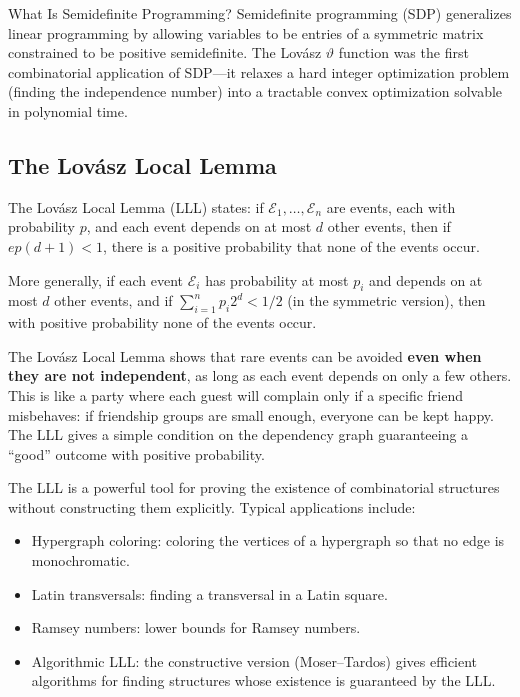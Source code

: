 \begin{knowledgebridge}{What Is Semidefinite Programming?}
Semidefinite programming (SDP) generalizes linear programming by allowing variables to be entries of a symmetric matrix constrained to be positive semidefinite. The Lov\'asz $\vartheta$ function was the first combinatorial application of SDP---it relaxes a hard integer optimization problem (finding the independence number) into a tractable convex optimization solvable in polynomial time.
\end{knowledgebridge}

\subsection{The Lov\'asz Local Lemma}

The Lov\'asz Local Lemma (LLL) states: if $\mathcal{E}_1, \ldots, \mathcal{E}_n$ are events, each with probability $p$, and each event depends on at most $d$ other events, then if $ep(d+1) < 1$, there is a positive probability that none of the events occur.

More generally, if each event $\mathcal{E}_i$ has probability at most $p_i$ and depends on at most $d$ other events, and if $\sum_{i=1}^n p_i 2^d < 1/2$ (in the symmetric version), then with positive probability none of the events occur.

\begin{bigidea}
The Lov\'asz Local Lemma shows that rare events can be avoided \textbf{even when they are not independent}, as long as each event depends on only a few others. This is like a party where each guest will complain only if a specific friend misbehaves: if friendship groups are small enough, everyone can be kept happy. The LLL gives a simple condition on the dependency graph guaranteeing a ``good'' outcome with positive probability.
\end{bigidea}

The LLL is a powerful tool for proving the existence of combinatorial structures without constructing them explicitly. Typical applications include:
\begin{itemize}
\item Hypergraph coloring: coloring the vertices of a hypergraph so that no edge is monochromatic.
\item Latin transversals: finding a transversal in a Latin square.
\item Ramsey numbers: lower bounds for Ramsey numbers.
\item Algorithmic LLL: the constructive version (Moser--Tardos) gives efficient algorithms for finding structures whose existence is guaranteed by the LLL.
\end{itemize}

